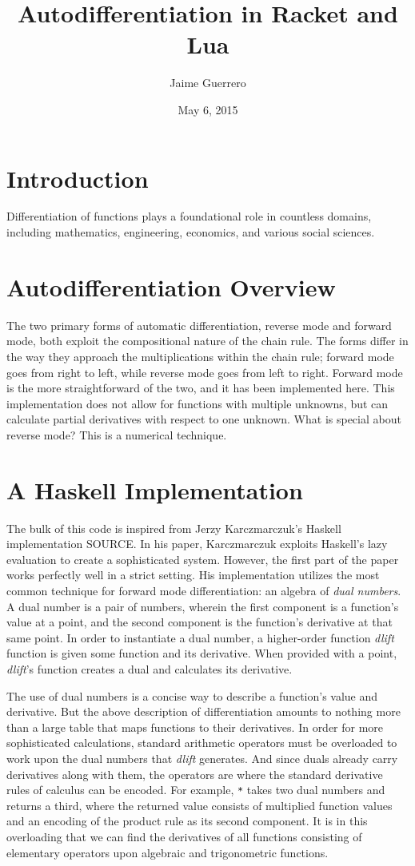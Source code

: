 \documentclass{article}
\author{Jaime Guerrero}
\date{May 6, 2015}
\title{Autodifferentiation in Racket and Lua}
\begin{document}
\maketitle

\section{Introduction}
Differentiation of functions plays a foundational role in countless domains,
including mathematics, engineering, economics, and various social sciences.

\section{Autodifferentiation Overview}
The two primary forms of automatic differentiation, reverse mode and forward
mode, both exploit the compositional nature of the chain rule.  The forms differ
in the way they approach the multiplications within the chain rule; forward mode
goes from right to left, while reverse mode goes from left to right.  Forward
mode is the more straightforward of the two, and it has been implemented here.
This implementation does not allow for functions with multiple unknowns, but can
calculate partial derivatives with respect to one unknown.  What is special
about reverse mode? This is a numerical technique.

\section{A Haskell Implementation}
The bulk of this code is inspired from Jerzy Karczmarczuk's Haskell
implementation SOURCE.  In his paper, Karczmarczuk exploits Haskell's lazy
evaluation to create a sophisticated system.  However, the first part of the
paper works perfectly well in a strict setting.  His implementation utilizes the
most common technique for forward mode differentiation: an algebra of
\textit{dual numbers}.  A dual number is a pair of numbers, wherein the first
component is a function's value at a point, and the second component is the
function's derivative at that same point. In order to instantiate a dual number,
a higher-order function \textit{dlift} function is given some function and its
derivative.  When provided with a point, \textit{dlift}'s function creates
a dual and calculates its derivative.

The use of dual numbers is a concise way to describe a function's value and
derivative.  But the above description of differentiation amounts to nothing
more than a large table that maps functions to their derivatives.  In order for
more sophisticated calculations, standard arithmetic operators must be
overloaded to work upon the dual numbers that \textit{dlift} generates.  And
since duals already carry derivatives along with them, the operators are where
the standard derivative rules of calculus can be encoded.  For example,
\texttt{*} takes two dual numbers and returns a third, where the returned value
consists of multiplied function values and an encoding of the product rule as
its second component.  It is in this overloading that we can find the
derivatives of all functions consisting of elementary operators upon algebraic
and trigonometric functions.
\end{document}
